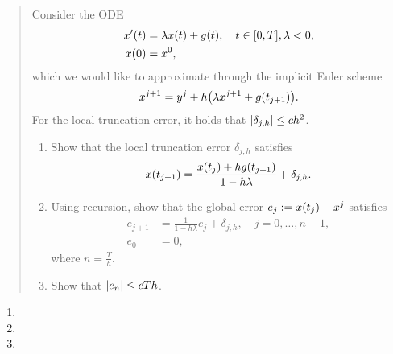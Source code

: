 \documentclass{exercise}
\begin{document}
	\section{}

	\begin{quote}
		Consider the ODE
		\begin{align*}
			x'\parentheses*{t} &= \lambda x\parentheses*{t} + g\parentheses*{t}, \quad t \in \brackets*{0, T}, \lambda < 0,\\
			x\parentheses*{0} &= x^0,
		\end{align*}
		which we would like to approximate through the implicit Euler scheme
		\[
			x^{j + 1} = y^j + h\parentheses*{\lambda x^{j + 1} + g\parentheses*{t_{j + 1}}}.
		\]
		For the local truncation error, it holds that \(\absolute*{\delta_{j, h}} \le ch^2\).
		\begin{enumerate}
			\item Show that the local truncation error \(\delta_{j, h}\) satisfies
			\[
				x\parentheses*{t_{j + 1}} = \frac{x\parentheses*{t_j} + hg\parentheses*{t_{j + 1}}}{1 - h\lambda} + \delta_{j, h}.
			\]
			\item Using recursion, show that the global error \(e_j := x\parentheses*{t_j} - x^j\) satisfies
			\begin{align*}
				e_{j + 1} &= \frac{1}{1 - h\lambda}e_j + \delta_{j, h}, \quad j = 0, \ldots, n - 1,\\
				e_0 &= 0,
			\end{align*}
			where \(n = \frac{T}{h}\).
			\item Show that \(\absolute*{e_n} \le cTh\).
		\end{enumerate}
	\end{quote}

	\begin{enumerate}
		\item
		\item
		\item
	\end{enumerate}
\end{document}
